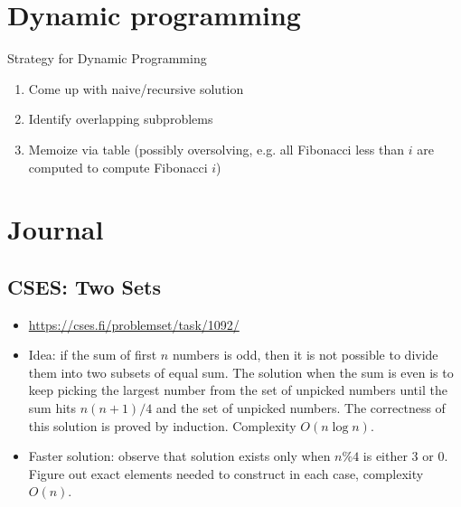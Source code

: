 \documentclass[titlepage, 12pt]{book}
\begin{document}
\chapter{Dynamic programming}

\begin{definition}{Strategy for Dynamic Programming}{}
    \begin{enumerate}
        \item Come up with naive/recursive solution
        \item Identify overlapping subproblems
        \item Memoize via table (possibly oversolving, e.g. all Fibonacci less
            than $i$ are computed to compute Fibonacci $i$)
    \end{enumerate}
\end{definition}

\chapter{Journal}

\section{CSES: Two Sets}

\begin{itemize}
    \item \url{https://cses.fi/problemset/task/1092/}
    \item Idea: if the sum of first $n$ numbers is odd, then it is not possible to
        divide them into two subsets of equal sum. The solution when the sum is even is
        to keep picking the largest number from the set of unpicked numbers until the
        sum hits $n(n+1)/4$ and the set of unpicked numbers. The correctness of this
        solution is proved by induction. Complexity $O(n\log n)$.
    \item Faster solution: observe that solution exists only when $n\%4$ is
        either 3 or 0. Figure out exact elements needed to construct in each
        case, complexity $O(n)$.
\end{itemize}
\end{document}
